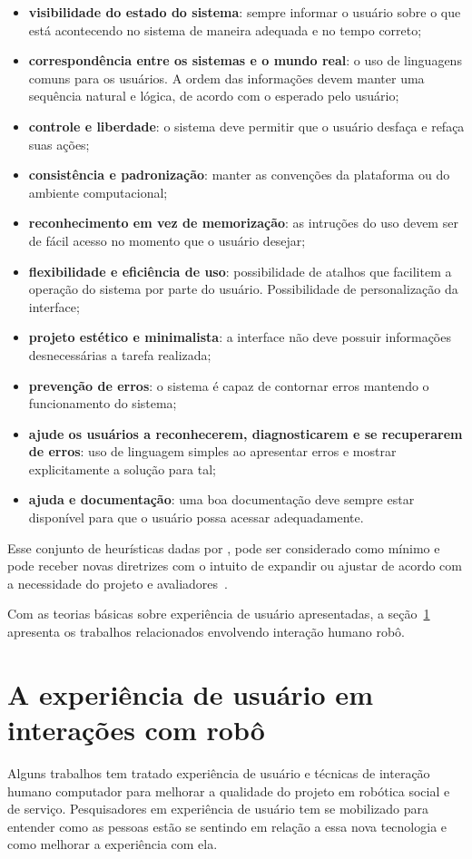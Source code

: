 \begin{itemize}
    \item \textbf{visibilidade do estado do sistema}: sempre informar o usuário sobre o que está acontecendo no sistema de maneira adequada e no tempo correto;
    \item \textbf{correspondência entre os sistemas e o mundo real}: o uso de linguagens comuns para os usuários. A ordem das informações devem manter uma sequência natural e lógica, de acordo com o esperado pelo usuário;
    \item \textbf{controle e liberdade}: o sistema deve permitir que o usuário desfaça e refaça suas ações;
    \item \textbf{consistência e padronização}: manter as convenções da plataforma ou do ambiente computacional;
    \item \textbf{reconhecimento em vez de memorização}: as intruções do uso devem ser de fácil acesso no momento que o usuário desejar;
    \item \textbf{flexibilidade e eficiência de uso}: possibilidade de atalhos que facilitem a operação do sistema por parte do usuário. Possibilidade de personalização da interface;
    \item \textbf{projeto estético e minimalista}: a interface não deve possuir informações desnecessárias a tarefa realizada;
    \item \textbf{prevenção de erros}: o sistema é capaz de contornar erros mantendo o funcionamento do sistema;
    \item \textbf{ajude os usuários a reconhecerem, diagnosticarem e se recuperarem de erros}: uso de linguagem simples ao apresentar erros e mostrar explicitamente a solução para tal;
    \item \textbf{ajuda e documentação}: uma boa documentação deve sempre estar disponível para que o usuário possa acessar adequadamente.
\end{itemize}

Esse conjunto de heurísticas dadas por , pode ser considerado como mínimo e pode receber novas diretrizes com o intuito de expandir ou ajustar de acordo com a necessidade do projeto e avaliadores~\cite{barbosa:2010, benyon:2011}.

Com as teorias básicas sobre experiência de usuário apresentadas, a seção~\ref{sec:ihrux} apresenta os trabalhos relacionados envolvendo interação humano robô.

\section{A experiência de usuário em interações com robô}
\label{sec:ihrux}
Alguns trabalhos tem tratado experiência de usuário e técnicas de interação humano computador para melhorar a qualidade do projeto em robótica social e de serviço. Pesquisadores em experiência de usuário tem se mobilizado para entender como as pessoas estão se sentindo em relação a essa nova tecnologia e como melhorar a experiência com ela.

